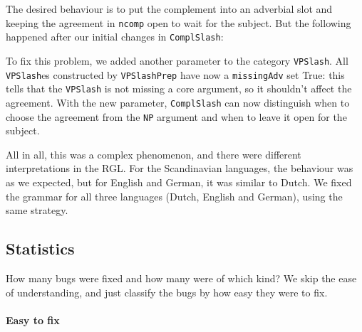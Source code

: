 The desired behaviour is to put the complement into an adverbial slot
and keeping the agreement in \texttt{ncomp} open to wait for the
subject. But the following happened after our initial changes in
\texttt{ComplSlash}:

\begin{EmptyItem}
\begin{Highlighting}[]
    \FunctionTok{=}  \NormalTok{;}
\FunctionTok{=} \OtherTok{=>}  \NormalTok{\} ; }
\end{Highlighting}
\end{EmptyItem}

To fix this problem, we added another parameter to the category
\texttt{VPSlash}. All \texttt{VPSlash}es constructed by
\texttt{VPSlashPrep} have now a \texttt{missingAdv} set True: this tells
that the \texttt{VPSlash} is not missing a core argument, so it
shouldn't affect the agreement. With the new parameter,
\texttt{ComplSlash} can now distinguish when to choose the agreement
from the \texttt{NP} argument and when to leave it open for the subject.

All in all, this was a complex phenomenon, and there were different
interpretations in the RGL. For the Scandinavian languages, the
behaviour was as we expected, but for English and German, it was
similar to Dutch. We fixed the grammar for all three languages (Dutch,
English and German), using the same strategy.

\subsection{Statistics}\label{numbers}

How many bugs were fixed and how many were of which kind? We skip the
ease of understanding, and just classify the bugs by how easy they were to fix.

\paragraph{Easy to fix}

